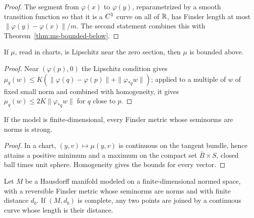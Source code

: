 \begin{proof}
  \leanok
  The segment from $\varphi(x)$ to $\varphi(y)$, reparametrized by a smooth transition function so
  that it is a $C^{1}$ curve on all of $\mathbb{R}$, has Finsler length at most
  $\|\varphi(y) - \varphi(x)\| / m$. The second statement combines this with
  Theorem~\ref{thm:ms-bounded-below}.
\end{proof}

\begin{lemma}
  \label{lem:ms-lipschitz}
  \leanok
  If $\mu$, read in charts, is Lipschitz near the zero section, then $\mu$ is bounded above.
\end{lemma}

\begin{proof}
  \leanok
  Near $(\varphi(p), 0)$ the Lipschitz condition gives
  $\mu_q(w) \leq K(\|\varphi(q) - \varphi(p)\| + \|\varphi_{*q} w\|)$; applied to a multiple of $w$ of
  fixed small norm and combined with homogeneity, it gives $\mu_q(w) \leq 2K \|\varphi_{*q} w\|$
  for $q$ close to $p$.
\end{proof}

\begin{theorem}
  \label{thm:ms-finite-dim}
  \leanok
  If the model is finite-dimensional, every Finsler metric whose seminorms are norms is strong.
\end{theorem}

\begin{proof}
  \leanok
  In a chart, $(y, v) \mapsto \mu(y, v)$ is continuous on the tangent bundle, hence attains a
  positive minimum and a maximum on the compact set $\bar B \times S$, closed ball times unit
  sphere. Homogeneity gives the bounds for every vector.
\end{proof}

\begin{corollary}
  \label{cor:ms-finsler-hopf-rinow}
  \leanok
  Let $M$ be a Hausdorff manifold modeled on a finite-dimensional normed space, with a reversible
  Finsler metric whose seminorms are norms and with finite distance $d_b$. If $(M, d_b)$ is
  complete, any two points are joined by a continuous curve whose length is their distance.
\end{corollary}

